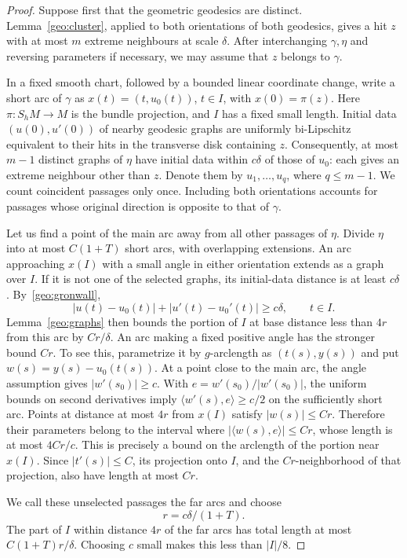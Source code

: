 \documentclass[10pt,oneside,reqno]{amsproc}
\numberwithin{equation}{section}
\theoremstyle{definition}
\theoremstyle{remark}
\renewcommand{\ge}{\geqslant}
\renewcommand{\le}{\leqslant}
\begin{document}
\begin{proof}
Suppose first that the geometric geodesics are distinct. Lemma~\ref{geo:cluster}, applied to both orientations of both geodesics, gives a hit $z$ with at most $m$ extreme neighbours at scale $\delta$. After interchanging $\gamma,\eta$ and reversing parameters if necessary, we may assume that $z$ belongs to $\gamma$.

In a fixed smooth chart, followed by a bounded linear coordinate change, write a short arc of $\gamma$ as $x(t)=(t,u_0(t))$, $t\in I$, with $x(0)=\pi(z)$. Here $\pi:S_hM\to M$ is the bundle projection, and $I$ has a fixed small length. Initial data $(u(0),u'(0))$ of nearby geodesic graphs are uniformly bi-Lipschitz equivalent to their hits in the transverse disk containing $z$. Consequently, at most $m-1$ distinct graphs of $\eta$ have initial data within $c\delta$ of those of $u_0$: each gives an extreme neighbour other than $z$. Denote them by $u_1,\ldots,u_q$, where $q\le m-1$. We count coincident passages only once. Including both orientations accounts for passages whose original direction is opposite to that of $\gamma$.

Let us find a point of the main arc away from all other passages of $\eta$. Divide $\eta$ into at most $C(1+T)$ short arcs, with overlapping extensions. An arc approaching $x(I)$ with a small angle in either orientation extends as a graph over $I$. If it is not one of the selected graphs, its initial-data distance is at least $c\delta$. By~\eqref{geo:gronwall},
\[
 |u(t)-u_0(t)|+|u'(t)-u_0'(t)|\ge c\delta,\qquad t\in I.
\]
Lemma~\ref{geo:graphs} then bounds the portion of $I$ at base distance less than $4r$ from this arc by $Cr/\delta$. An arc making a fixed positive angle has the stronger bound $Cr$. To see this, parametrize it by $g$-arclength as $(t(s),y(s))$ and put $w(s)=y(s)-u_0(t(s))$. At a point close to the main arc, the angle assumption gives $|w'(s_0)|\ge c$. With $e=w'(s_0)/|w'(s_0)|$, the uniform bounds on second derivatives imply $\langle w'(s),e\rangle\ge c/2$ on the sufficiently short arc. Points at distance at most $4r$ from $x(I)$ satisfy $|w(s)|\le Cr$. Therefore their parameters belong to the interval where $|\langle w(s),e\rangle|\le Cr$, whose length is at most $4Cr/c$. This is precisely a bound on the arclength of the portion near $x(I)$. Since $|t'(s)|\le C$, its projection onto $I$, and the $Cr$-neighborhood of that projection, also have length at most $Cr$.

We call these unselected passages the far arcs and choose
\begin{equation}
 r=c\delta/(1+T).
 \label{geo:radius}
\end{equation}
The part of $I$ within distance $4r$ of the far arcs has total length at most $C(1+T)r/\delta$. Choosing $c$ small makes this less than $|I|/8$.


\end{proof}
\end{document}
